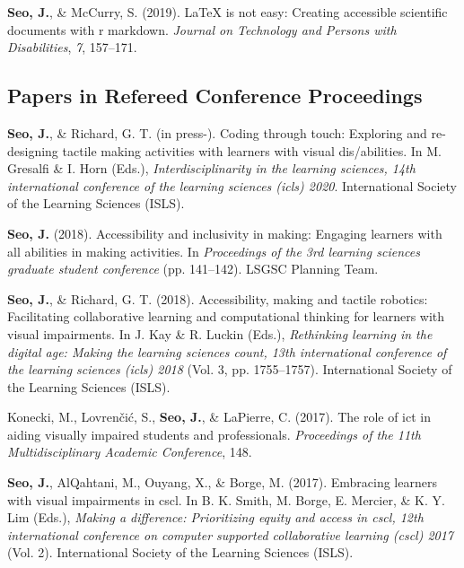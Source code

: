 \documentclass[11pt, a4paper]{awesome-cv}
\begin{document}
\leavevmode\hypertarget{ref-seo2019arow}{}%
\textbf{Seo, J.}, \& McCurry, S. (2019). LaTeX is not easy: Creating accessible scientific documents with r markdown. \emph{Journal on Technology and Persons with Disabilities}, \emph{7}, 157--171.

\endgroup

\hypertarget{papers-in-refereed-conference-proceedings}{%
\subsection{Papers in Refereed Conference Proceedings}\label{papers-in-refereed-conference-proceedings}}

\begingroup
\setlength{\parindent}{-0.5in}
\setlength{\leftskip}{0.5in}

\hypertarget{refs_proceedings}{}
\leavevmode\hypertarget{ref-seo2020coding}{}%
\textbf{Seo, J.}, \& Richard, G. T. (in press-). Coding through touch: Exploring and re-designing tactile making activities with learners with visual dis/abilities. In M. Gresalfi \& I. Horn (Eds.), \emph{Interdisciplinarity in the learning sciences, 14th international conference of the learning sciences (icls) 2020}. International Society of the Learning Sciences (ISLS).

\leavevmode\hypertarget{ref-seo2018making}{}%
\textbf{Seo, J.} (2018). Accessibility and inclusivity in making: Engaging learners with all abilities in making activities. In \emph{Proceedings of the 3rd learning sciences graduate student conference} (pp. 141--142). LSGSC Planning Team.

\leavevmode\hypertarget{ref-seo2018accessibility}{}%
\textbf{Seo, J.}, \& Richard, G. T. (2018). Accessibility, making and tactile robotics: Facilitating collaborative learning and computational thinking for learners with visual impairments. In J. Kay \& R. Luckin (Eds.), \emph{Rethinking learning in the digital age: Making the learning sciences count, 13th international conference of the learning sciences (icls) 2018} (Vol. 3, pp. 1755--1757). International Society of the Learning Sciences (ISLS).

\leavevmode\hypertarget{ref-konecki2017role}{}%
Konecki, M., Lovrenčić, S., \textbf{Seo, J.}, \& LaPierre, C. (2017). The role of ict in aiding visually impaired students and professionals. \emph{Proceedings of the 11th Multidisciplinary Academic Conference}, 148.

\leavevmode\hypertarget{ref-seo2017embracing}{}%
\textbf{Seo, J.}, AlQahtani, M., Ouyang, X., \& Borge, M. (2017). Embracing learners with visual impairments in cscl. In B. K. Smith, M. Borge, E. Mercier, \& K. Y. Lim (Eds.), \emph{Making a difference: Prioritizing equity and access in cscl, 12th international conference on computer supported collaborative learning (cscl) 2017} (Vol. 2). International Society of the Learning Sciences (ISLS).
\end{document}

